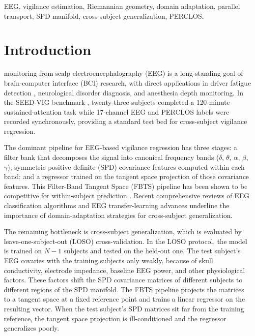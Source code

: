 \documentclass[journal,twoside,web]{ieeecolor2}
\begin{document}
\begin{IEEEkeywords}
EEG, vigilance estimation, Riemannian geometry, domain adaptation,
parallel transport, SPD manifold, cross-subject generalization, PERCLOS.
\end{IEEEkeywords}

\section{Introduction}
\label{sec:intro}

 monitoring from scalp electroencephalography
(EEG) is a long-standing goal of brain-computer interface (BCI)
research, with direct applications in driver fatigue detection
\cite{gao2024, cui2023},
neurological disorder diagnosis, and anesthesia depth monitoring.
In the SEED-VIG benchmark \cite{zheng2017}, twenty-three
subjects completed a 120-minute sustained-attention task while 17-channel
EEG and PERCLOS labels were recorded synchronously, providing a standard
test bed for cross-subject vigilance regression.

The dominant pipeline for EEG-based vigilance regression has three
stages: a filter bank that decomposes the signal into canonical frequency
bands ($\delta$, $\theta$, $\alpha$, $\beta$, $\gamma$); symmetric positive
definite (SPD) covariance features computed within each band; and a
regressor trained on the tangent space projection of those covariance
features. This Filter-Band Tangent Space (FBTS) pipeline has been shown
to be competitive for within-subject prediction
\cite{zheng2017, zanini2018, Rodrigues2019}. Recent
comprehensive reviews of EEG classification algorithms
\cite{lotte2018review} and EEG transfer-learning advances
\cite{wu2022tnsre} underline the importance of domain-adaptation
strategies for cross-subject generalization.

The remaining bottleneck is cross-subject generalization, which is
evaluated by leave-one-subject-out (LOSO) cross-validation. In the LOSO
protocol, the model is trained on $N-1$ subjects and tested on the held-out
one. The test subject's EEG covaries with the training subjects only
weakly, because of skull conductivity, electrode impedance, baseline
EEG power, and other physiological factors. These factors shift the
SPD covariance matrices of different subjects to different regions of
the SPD manifold. The FBTS pipeline projects the matrices to a tangent
space at a fixed reference point and trains a linear regressor on the
resulting vector. When the test subject's SPD matrices sit far from
the training reference, the tangent space projection is ill-conditioned
and the regressor generalizes poorly.
\end{document}
